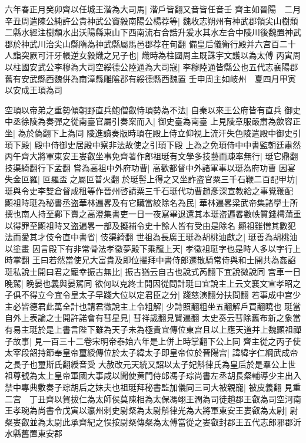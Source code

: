 六年春正月癸卯齊以任城王湝為大司馬|{
	湝戶皆翻又音皆任音壬}
齊主如晉陽　二月辛丑周遣陳公純許公貴神武公竇毅南陽公楊荐等|{
	魏收志朔州有神武郡領尖山樹頹二縣水經注樹頹水出沃陽縣東山下西南流右合誥升爰水其水左合中陵川後魏置神武郡於神武川治尖山縣隋為神武縣屬馬邑郡荐在甸翻}
備皇后儀衛行殿并六宫百二十人詣突厥可汗牙帳逆女毅熾之兄子也|{
	熾時為柱國周主既誅宇文護以為太傅}
丙寅周以柱國安武公李穆為大司空綏德公陸通為大司寇|{
	李穆陸通皆縣公也五代志襄陽郡舊有安武縣西魏併為南漳縣雕隂郡有綏德縣西魏置}
壬申周主如岐州　夏四月甲寅以安成王頊為司

空頊以帝弟之重勢傾朝野直兵鮑僧叡恃頊勢為不法|{
	自秦以來王公府皆有直兵}
御史中丞徐陵為奏彈之從南臺官屬引奏案而入|{
	御史臺為南臺}
上見陵章服嚴肅為歛容正坐|{
	為於偽翻下上為同}
陵進讀奏版時頊在殿上侍立仰視上流汗失色陵遣殿中御史引頊下殿|{
	殿中侍御史居殿中察非法故使之引頊下殿}
上為之免頊侍中中書監朝廷肅然　丙午齊大將軍東安王婁叡坐事免齊著作郎祖珽有文學多技藝而疎率無行|{
	珽它鼎翻技渠綺翻行下孟翻}
嘗為高祖中外府功曹|{
	高歡都督中外諸軍事以珽為府功曹}
因宴失金叵羅|{
	叵羅盃之屬叵普火翻}
於珽髻上得之又坐詐盗官粟三千石鞭二百配甲坊|{
	珽與令史李雙倉督成租等作晉州啓請粟三千石珽代功曹趙彥深宣教給之事覺鞭配}
顯祖時珽為秘書丞盗華林遍畧及有它贜當絞除名為民|{
	華林遍畧梁武帝集諸學士所撰也南人持至鄴下賣之高澄集書吏一日一夜寫畢退還其本珽盗遍畧數帙質錢樗蒲重以得罪至顯祖時又盗遍畧一部及擬補令史十餘人皆有受由是除名}
顯祖雖憎其數犯法而愛其才伎令直中書省|{
	伎渠綺翻}
世祖為長廣王珽為胡桃油獻之|{
	珽善為胡桃油以塗畫}
因言殿下有非常骨法孝徵夢殿下乘龍上天|{
	孝徵祖珽字也是時人多以字行上時掌翻}
王曰若然當使兄大富貴及即位擢拜中書侍郎遷散騎常侍與和士開共為姦諂珽私說士開曰君之寵幸振古無比|{
	振古猶云自古也說式芮翻下宜說微說同}
宫車一日晚駕|{
	晚晏也義與晏駕同}
欲何以克終士開因從問計珽曰宜說主上云文襄文宣孝昭之子俱不得立今宜令皇太子早踐大位以定君臣之分|{
	踐慈演翻分扶問翻}
若事成中宫少主必皆德君此萬全計也請君微說主上令粗解|{
	少詩照翻粗坐五翻解戶買翻曉也}
珽當自外上表論之士開許諾會有彗星見|{
	彗祥歲翻見賢遍翻}
太史奏云彗除舊布新之象當有易主珽於是上書言陛下雖為天子未為極貴宜傳位東宫且以上應天道并上魏顯祖禪子故事|{
	見一百三十二卷宋明帝泰始六年是上併上時掌翻下公上同}
齊主從之丙子使太宰段韶持節奉皇帝璽綬傳位於太子緯太子即皇帝位於晉陽宫|{
	諱緯字仁綱武成帝之長子也璽斯氏翻綬音受}
大赦改元天統又詔以太子妃斛律氏為皇后於是羣公上世祖尊號為太上皇帝軍國大事咸以聞使黄門侍郎馮子琮尚書左丞胡長粲輔導少主出入禁中專典敷奏子琮胡后之妹夫也祖珽拜秘書監加儀同三司大被親寵|{
	被皮義翻}
見重二宫　丁丑齊以賀拔仁為太師侯莫陳相為太保馮翊王潤為司徒趙郡王叡為司空河南王孝琬為尚書令戊寅以瀛州刺史尉粲為太尉斛律光為大將軍東安王婁叡為太尉|{
	尉粲婁叡並為太尉此承齊紀之悮按尉粲傳粲為太傅當從之婁叡封郡王五代志郎邪郡沂水縣舊置東安郡}

